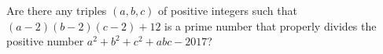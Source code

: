 Are there any triples $(a,b,c)$ of positive integers such that $(a-2)(b-2)(c-2)+12$ is a prime number that properly divides the positive number $a^2+b^2+c^2+abc-2017$?